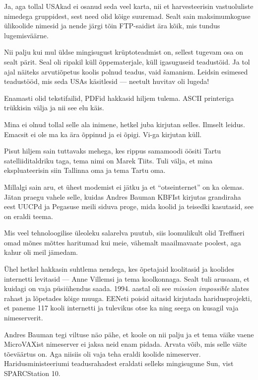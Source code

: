 Ja, aga tollal USAkad ei osanud seda veel karta, nii et 
harvesteerisin vastuoluliste nimedega gruppidest, sest need olid kõige 
suuremad. Sealt sain maksimumkoguse ülikoolide nimesid ja nende järgi tõin FTP-saidist ära kõik, mis tundus lugemisväärne.


Nii palju kui mul üldse mingisugust krüptoteadmist on, sellest tugevam 
osa on sealt pärit. Seal oli ripakil küll õppematerjale, küll 
igasuguseid teadustöid. Ja tol ajal näiteks arvutiõpetus koolis polnud 
teadus, vaid šamanism. Leidsin esimesed teadustööd, mis 
seda USAs käsitlesid --- neetult huvitav oli lugeda! 


Enamasti olid tekstifailid, PDFid hakkasid hiljem tulema. 
ASCII printeriga trükkisin välja ja nii see elu käis. 


Mina ei olnud tollal selle ala inimene, hetkel juba kirjutan selles. Ilmselt leidus. 
Emacsit ei ole ma ka ära õppinud ja ei õpigi. Vi-ga kirjutan küll. 

Pisut hiljem sain tuttavaks mehega, kes rippus samamoodi öösiti Tartu 
satelliiditaldriku taga, tema nimi on Marek Tiits. 
Tuli välja, et mina ekspluateerisin siin Tallinna oma ja tema Tartu oma. 

Millalgi sain aru, et ühest 
modemist ei jätku ja et \enquote{otseinternet} on ka olemas. 
Jätan praegu vahele selle, kuidas Andres Bauman 
KBFIst kirjutas grandiraha eest UUCPd ja Pegasuse meili siduva 
proge, mida koolid ja teisedki kasutasid, see on eraldi teema. 

Mis veel tehnoloogilise üleoleku salarelva puutub, siis 
loomulikult olid Treffneri omad mõnes mõttes haritumad kui 
meie, vähemalt maailmavaate poolest, aga kahur oli meil jämedam. 

Ühel hetkel hakkasin suhtlema nendega, kes õpetajaid 
koolitasid ja koolides internetti levitasid --- Anne Villemsi ja tema koolkonnaga. Sealt tuli arusaam, et kuidagi on vaja 
püsiühendus saada. 1994. aastal oli see \emph{mission impossible} alates 
rahast ja lõpetades kõige muuga. EENeti poisid aitasid kirjutada 
haridusprojekti, et paneme 117 kooli internetti ja tulevikus otse ka ning seega on kusagil vaja nimeserverit. 

Andres Bauman tegi viltuse näo pähe, et koole on nii palju 
ja et tema väike vaene MicroVAXist nimeserver ei jaksa neid enam pidada. 
Arvata võib, mis selle väite tõeväärtus on. Aga niisiis oli vaja teha eraldi koolide nimeserver. Haridusministeeriumi teadusrahadest eraldati selleks
mingisugune Sun, vist SPARCStation 10. 


